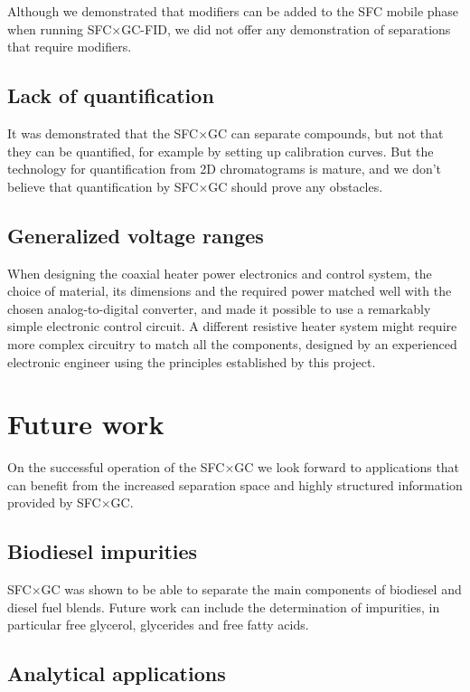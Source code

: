 Although we demonstrated that modifiers can be added to the SFC mobile phase
when running SFC×GC-FID, we did not offer any demonstration of separations that
require modifiers.

\subsection{Lack of quantification}

It was demonstrated that the SFC×GC can separate compounds, but not that they
can be quantified, for example by setting up calibration curves. But the
technology for quantification from 2D chromatograms is mature, and we don't
believe that quantification by SFC×GC should prove any obstacles.

\subsection{Generalized voltage ranges}

When designing the coaxial heater power electronics and control system, the
choice of material, its dimensions and the required power matched well with the
chosen analog-to-digital converter, and made it possible to use a remarkably
simple electronic control circuit. A different resistive heater system might
require more complex circuitry to match all the components, designed by an
experienced electronic engineer using the principles established by this
project.

\section{Future work}

On the successful operation of the SFC×GC we look forward to applications that
can benefit from the increased separation space and highly structured
information provided by SFC×GC.


\subsection{Biodiesel impurities}

SFC×GC was shown to be able to separate the main components of biodiesel and
diesel fuel blends. Future work can include the determination of impurities, in
particular free glycerol, glycerides and free fatty acids.

\subsection{Analytical applications}

